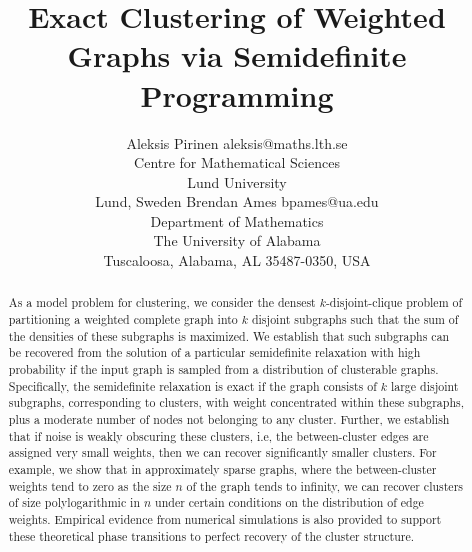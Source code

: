 \documentclass[twoside,11pt]{article}
\newcommand{\0}{\bs{0}}
\begin{document}
\title{Exact Clustering of Weighted Graphs via Semidefinite Programming}
\author{\name Aleksis Pirinen \email aleksis@maths.lth.se \\
	\addr Centre for Mathematical Sciences \\
	Lund University\\
	Lund, Sweden
	\AND
	\name Brendan Ames \email bpames@ua.edu \\
	\addr Department of Mathematics\\
	The University of Alabama\\
	Tuscaloosa, Alabama, AL 35487-0350, USA
	}



\maketitle
\begin{abstract}%
As a model problem for clustering, we consider the densest $k$-disjoint-clique problem of partitioning a weighted complete
graph into
$k$ disjoint subgraphs such that the sum of the densities of these subgraphs is maximized.
We establish that such subgraphs can be recovered from the solution of a particular
semidefinite relaxation with high probability if the input graph is sampled from a distribution of clusterable graphs.
Specifically, the semidefinite relaxation is exact if the graph
consists of \(k\) large disjoint subgraphs, corresponding to clusters, with weight concentrated within these subgraphs,
plus a moderate number of nodes not belonging to any cluster.
Further, we establish that if noise is weakly obscuring these clusters, i.e, the between-cluster edges are assigned
very small weights,
then we can recover significantly smaller clusters.
For example, we show that in approximately sparse graphs, where the between-cluster weights tend to zero as the size $n$ of the graph tends to infinity, we can recover clusters of size polylogarithmic in $n$
under certain conditions on the distribution of edge weights.
Empirical evidence from
numerical simulations is also provided to support these theoretical phase transitions to perfect recovery of the cluster structure.
\end{abstract}
\end{document}
